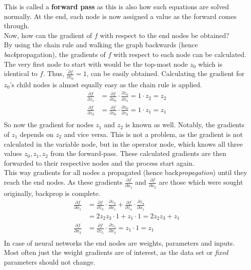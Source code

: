This is called a \textbf{forward pass} as this is also how such equations are solved normally.
At the end, each node is now assigned a value as the forward comes through. \\
Now, how can the gradient of $f$ with respect to the end nodes be obtained? \\
By using the chain rule and walking the graph backwards (hence \textit{back}propagation), the gradients of $f$ with respect to each node can be calculated.
The very first node to start with would be the top-most node $z_0$ which is identical to $f$.
Thus,  $\frac{\partial f}{\partial z_0} = 1$, can be easily obtained.
Calculating the gradient for $z_0$'s child nodes is almost equally easy as the chain rule is applied.
\begin{align}
    \frac{\partial f}{\partial z_1} & = \frac{\partial f}{\partial z_0} \cdot \frac{\partial z_0}{\partial z_1} = 1 \cdot z_2 = z_2 \\
    \frac{\partial f}{\partial z_2} & = \frac{\partial f}{\partial z_0} \cdot \frac{\partial z_0}{\partial z_2} = 1 \cdot z_1 = z_1 \\
\end{align}
So now the gradient for nodes $z_1$ and $z_2$ is known as well.
Notably, the gradients of $z_1$ depends on $z_2$ and vice versa.
This is not a problem, as the gradient is not calculated in the variable node, but in the operator node, which knows all three values $z_0, z_1, z_2$ from the forward-pass.
These calculated gradients are then forwarded to their respective nodes and the process start again.\\
This way gradients for all nodes a propagated (hence back\textit{propagation}) until they reach the end nodes.
As these gradients $\frac{\partial f}{\partial x_1}$ and $\frac{\partial f}{\partial x_2}$ are those which were sought originally, backprop is complete.
\begin{align}
    \frac{\partial f}{\partial x_1} & = \frac{\partial f}{\partial z_3} \cdot \frac{\partial z_3}{\partial x_1} + \frac{\partial f}{\partial z_4} \cdot \frac{\partial z_4}{\partial x_1} \\
    & = 2 z_2 z_3 \cdot 1 + z_1 \cdot 1 = 2 z_2 z_3 + z_1 \\
    \frac{\partial f}{\partial x_2} & = \frac{\partial f}{\partial z_5} \cdot \frac{\partial z_5}{\partial x_2} = z_1 \cdot 1 = z_1 \\
\end{align}
In case of neural networks the end nodes are weights, parameters and inputs.
Most often just the weight gradients are of interest, as the data set or \textit{fixed} parameters should not change.


